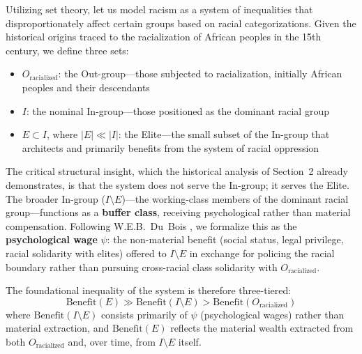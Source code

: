 \documentclass[12pt]{article}
\begin{document}
Utilizing set theory, let us model racism as a system of inequalities that disproportionately affect certain groups based on racial categorizations. Given the historical origins traced to the racialization of African peoples in the 15th century, we define three sets:

\begin{itemize}
    \item $O_{\text{racialized}}$: the Out-group---those subjected to racialization, initially African peoples and their descendants
    \item $I$: the nominal In-group---those positioned as the dominant racial group
    \item $E \subset I$, where $|E| \ll |I|$: the Elite---the small subset of the In-group that architects and primarily benefits from the system of racial oppression
\end{itemize}

The critical structural insight, which the historical analysis of Section~2 already demonstrates, is that the system does not serve the In-group; it serves the Elite. The broader In-group ($I \setminus E$)---the working-class members of the dominant racial group---functions as a \textbf{buffer class}, receiving psychological rather than material compensation. Following W.E.B.\ Du~Bois \cite{dubois}, we formalize this as the \textbf{psychological wage} $\psi$: the non-material benefit (social status, legal privilege, racial solidarity with elites) offered to $I \setminus E$ in exchange for policing the racial boundary rather than pursuing cross-racial class solidarity with $O_{\text{racialized}}$.

The foundational inequality of the system is therefore three-tiered:
\[
\text{Benefit}(E) \gg \text{Benefit}(I \setminus E) > \text{Benefit}(O_{\text{racialized}})
\]
where $\text{Benefit}(I \setminus E)$ consists primarily of $\psi$ (psychological wages) rather than material extraction, and $\text{Benefit}(E)$ reflects the material wealth extracted from both $O_{\text{racialized}}$ and, over time, from $I \setminus E$ itself.
\end{document}
